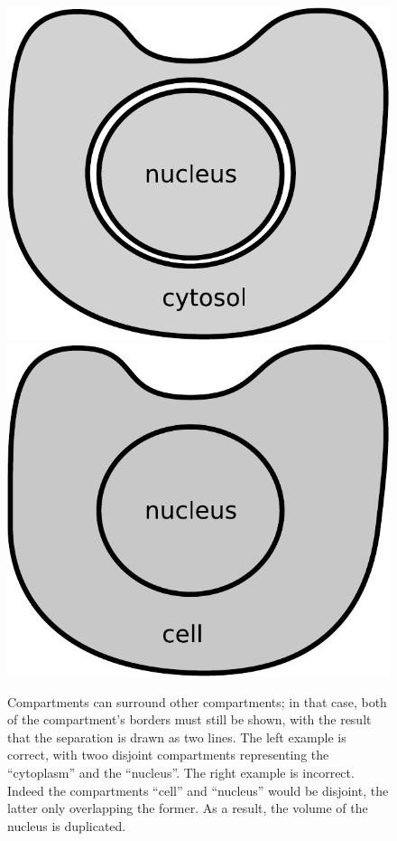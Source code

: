 \begin{figure}[H]
  \centering
  \includegraphics[scale = 0.4]{examples/compartment-cell}
 \includegraphics[scale = 0.4]{examples/compartment-cell-wrong}
  \caption{Compartments can surround other compartments; in that case, both of the compartment's borders must still be shown, with the result that the separation is drawn as two lines. The left example is correct, with twoo disjoint compartments representing the ``cytoplasm'' and the ``nucleus''. The right example is incorrect. Indeed the compartments ``cell'' and ``nucleus'' would be disjoint, the latter only overlapping the former. As a result, the volume of the nucleus is duplicated.}
  \label{fig:two-comp}
\end{figure}

